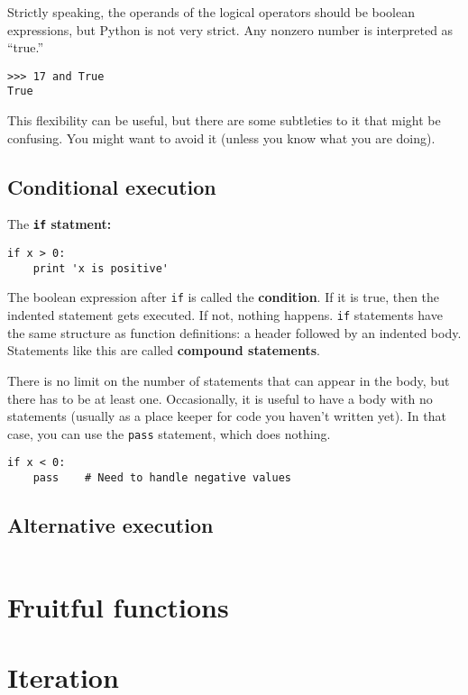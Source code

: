\documentclass{article}
\begin{document}
Strictly speaking, the operands of the logical operators should be
boolean expressions, but Python is not very strict. Any nonzero number
is interpreted as ``true.''
\begin{verbatim}
>>> 17 and True
True
\end{verbatim}
This flexibility can be useful, but there are some subtleties to it
that might be confusing. You might want to avoid it (unless you know
what you are doing).
\subsection{Conditional execution}
The \textbf{\texttt{if} statment:}
\begin{verbatim}
if x > 0:
    print 'x is positive'
\end{verbatim}
The boolean expression after \verb|if| is called the \textbf{condition}.
If it is true, then the indented statement gets executed. If not, nothing
happens.
\verb|if| statements have the same structure as function definitions: a
header followed by an indented body. Statements like this are called
\textbf{compound statements}.

There is no limit on the number of statements that can appear in the
body, but there has to be at least one. Occasionally, it is useful to
have a body with no statements (usually as a place keeper for code you
haven't written yet). In that case, you can use the \verb|pass| statement,
which does nothing.
\begin{verbatim}
if x < 0:
    pass    # Need to handle negative values
\end{verbatim}

\subsection{Alternative execution}
\begin{verbatim}
\end{verbatim}
\subsection{}

\section{Fruitful functions}
\section{Iteration}
\newpage%
\end{document}
